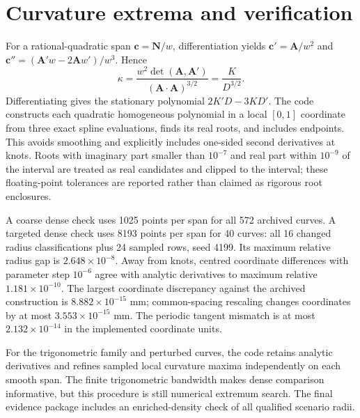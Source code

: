 \documentclass[11pt]{article}
\begin{document}
\section{Curvature extrema and verification}
For a rational-quadratic span $\mathbf c=\mathbf N/w$, differentiation yields $\mathbf c'=\mathbf A/w^2$ and $\mathbf c''=(\mathbf A'w-2\mathbf Aw')/w^3$. Hence
\begin{equation}
 \kappa=\frac{w^2\det(\mathbf A,\mathbf A')}{(\mathbf A\cdot\mathbf A)^{3/2}}
 =\frac{K}{D^{3/2}}.
\end{equation}
Differentiating gives the stationary polynomial $2K'D-3KD'$. The code constructs each quadratic homogeneous polynomial in a local $[0,1]$ coordinate from three exact spline evaluations, finds its real roots, and includes endpoints. This avoids smoothing and explicitly includes one-sided second derivatives at knots. Roots with imaginary part smaller than $10^{-7}$ and real part within $10^{-9}$ of the interval are treated as real candidates and clipped to the interval; these floating-point tolerances are reported rather than claimed as rigorous root enclosures.

A coarse dense check uses 1025 points per span for all 572 archived curves. A targeted dense check uses 8193 points per span for 40 curves: all 16 changed radius classifications plus 24 sampled rows, seed 4199. Its maximum relative radius gap is $2.648\times10^{-8}$. Away from knots, centred coordinate differences with parameter step $10^{-6}$ agree with analytic derivatives to maximum relative $1.181\times10^{-10}$. The largest coordinate discrepancy against the archived construction is $8.882\times10^{-15}$ mm; common-spacing rescaling changes coordinates by at most $3.553\times10^{-15}$ mm. The periodic tangent mismatch is at most $2.132\times10^{-14}$ in the implemented coordinate units.

For the trigonometric family and perturbed curves, the code retains analytic derivatives and refines sampled local curvature maxima independently on each smooth span. The finite trigonometric bandwidth makes dense comparison informative, but this procedure is still numerical extremum search. The final evidence package includes an enriched-density check of all qualified scenario radii.
\end{document}
